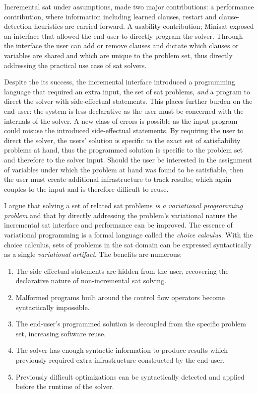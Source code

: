 Incremental \ac{sat} under assumptions, made two major contributions: a
performance contribution, where information including learned clauses, restart
and clause-detection heuristics are carried forward. A usability contribution;
Minisat exposed an interface that allowed the end-user to directly program the
solver. Through the interface the user can add or remove clauses and dictate
which clauses or variables are shared and which are unique to the problem set,
thus directly addressing the practical use case of \ac{sat} solvers.

Despite the its success, the incremental interface introduced a programming
language that required an extra input, the set of \ac{sat} problems, \emph{and}
a program to direct the solver with side-effectual statements. This places
further burden on the end-user: the system is less-declarative as the user must
be concerned with the internals of the solver. A new class of errors is possible
as the input program could misuse the introduced side-effectual statements. By
requiring the user to direct the solver, the users' solution is specific to the
exact set of satisfiability problems at hand, thus the programmed solution is
specific to the problem set and therefore to the solver input. Should the user
be interested in the assignment of variables under which the problem at hand was
found to be satisfiable, then the user must create additional infrastructure to
track results; which again couples to the input and is therefore difficult to
reuse.

I argue that solving a set of related \ac{sat} problems \emph{is a variational
  programming problem} and that by directly addressing the problem's variational
nature the incremental \ac{sat} interface and performance can be improved. The
essence of variational programming is a formal language called the \emph{choice
  calculus}. With the choice calculus, sets of problems in the \ac{sat} domain
can be expressed syntactically as a single \emph{variational artifact}. The
benefits are numerous:
\begin{enumerate}
\item The side-effectual statements are hidden from the user, recovering the
  declarative nature of non-incremental \ac{sat} solving.
\item Malformed programs built around the control flow operators become
  syntactically impossible.
\item The end-user's programmed solution is decoupled from the specific problem
  set, increasing software reuse.
\item The solver has enough syntactic information to produce results which
  previously required extra infrastructure constructed by the end-user.
\item Previously difficult optimizations can be syntactically detected and
  applied before the runtime of the solver.
\end{enumerate}


